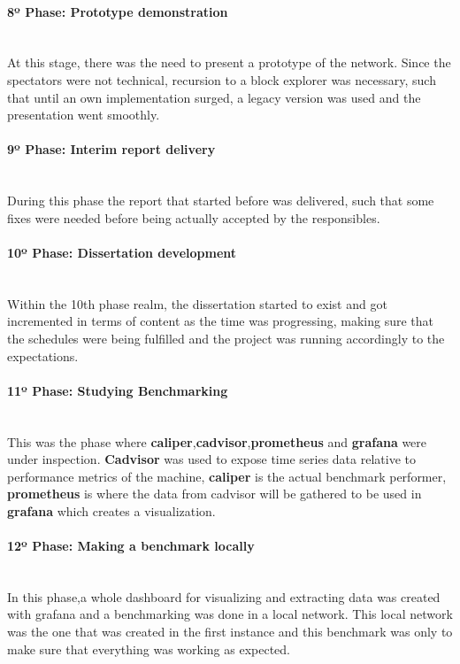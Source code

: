 \paragraph{8º Phase: Prototype demonstration}\mbox{}\\
At this stage, there was the need to present a prototype of the network. Since the spectators were not technical, recursion to a block explorer was necessary, such that until an own implementation surged, a legacy version was used and the presentation went smoothly.

\paragraph{9º Phase: Interim report delivery} \mbox{}\\
During this phase the report that started before was delivered, such that some fixes were needed before being actually accepted by the responsibles.

\paragraph{10º Phase: Dissertation development}\mbox{}\\
Within the 10th phase realm, the dissertation started to exist and got incremented in terms of content as the time was progressing, making sure that the schedules were being fulfilled and the project was running accordingly to the expectations.

\paragraph{11º Phase: Studying Benchmarking}\mbox{}\\
This was the phase where \textbf{caliper},\textbf{cadvisor},\textbf{prometheus} and \textbf{grafana} were under inspection. \textbf{Cadvisor} was used to expose time series data relative to performance metrics of the machine, \textbf{caliper} is the actual benchmark performer, \textbf{prometheus} is where the data from cadvisor will be gathered to be used in \textbf{grafana} which creates a visualization.

\paragraph{12º Phase: Making a benchmark locally}\mbox{}\\
In this phase,a whole dashboard for visualizing and extracting data was created with grafana and a benchmarking was done in a local network. This local network was the one that was created in the first instance and this benchmark was only to make sure that everything was working as expected.  


